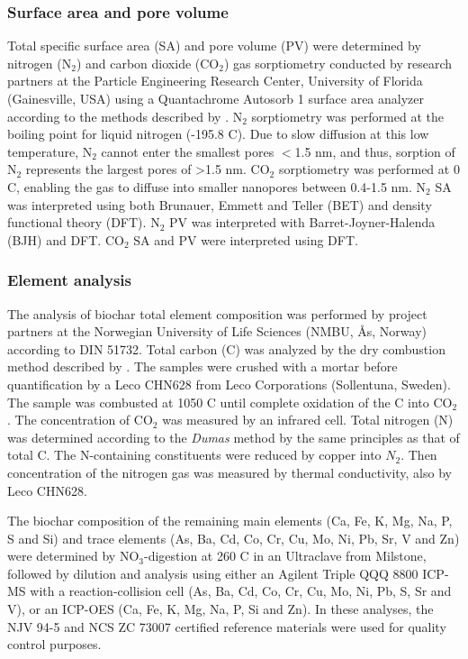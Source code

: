\subsubsection{Surface area and pore volume}
Total specific surface area (SA) and pore volume (PV) were determined by nitrogen ($\mathrm{N_2}$) and carbon dioxide ($\mathrm{CO_2}$) gas sorptiometry conducted by research partners at the Particle Engineering Research Center, University of Florida (Gainesville, USA) using a Quantachrome Autosorb 1 surface area analyzer according to the methods described by \cite{kwon2005}. $\mathrm{N_2}$ sorptiometry was performed at the boiling point for liquid nitrogen (-195.8 \textdegree C). Due to slow diffusion at this low temperature, $\mathrm{N_2}$ cannot enter the smallest pores $<$1.5 nm, and thus, sorption of $\mathrm{N_2}$ represents the largest pores of \textgreater 1.5 nm. $\mathrm{CO_2}$ sorptiometry was performed at 0 \textdegree C, enabling the gas to diffuse into smaller nanopores between 0.4-1.5 nm. $\mathrm{N_2}$ SA was interpreted using both Brunauer, Emmett and Teller (BET) and density functional theory (DFT). $\mathrm{N_2}$ PV was interpreted with Barret-Joyner-Halenda (BJH) and DFT. $\mathrm{CO_2}$ SA and PV were interpreted using DFT. 

\subsubsection{Element analysis}
The analysis of biochar total element composition was performed by project partners at the Norwegian University of Life Sciences (NMBU, Ås, Norway) according to DIN 51732. Total carbon (C) was analyzed by the dry combustion method described by \cite{nelson1983total}. The samples were crushed with a mortar before quantification by a Leco CHN628 from Leco Corporations (Sollentuna, Sweden). The sample was combusted at 1050 \textdegree C until complete oxidation of the C into $\mathrm{CO_2}$. The concentration of $\mathrm{CO_2}$ was measured by an infrared cell. Total nitrogen (N) was determined according to the \textit{Dumas} method \citep{Dumas1983total} by the same principles as that of total C. The N-containing constituents were reduced by copper into $N_2$. Then concentration of the nitrogen gas was measured by thermal conductivity, also by Leco CHN628. 

The biochar composition of the remaining main elements (Ca, Fe, K, Mg, Na, P, S and Si) and trace elements (As, Ba, Cd, Co, Cr, Cu, Mo, Ni, Pb, Sr, V and Zn) were determined by $\mathrm{NO_3}$-digestion at 260 \textdegree C in an Ultraclave from Milstone, followed by dilution and analysis using either an Agilent Triple QQQ 8800 ICP-MS with a reaction-collision cell (As, Ba, Cd, Co, Cr, Cu, Mo, Ni, Pb, S, Sr and V), or an ICP-OES (Ca, Fe, K, Mg, Na, P, Si and Zn). In these analyses, the NJV 94-5 and NCS ZC 73007 certified reference materials were used for quality control purposes.

